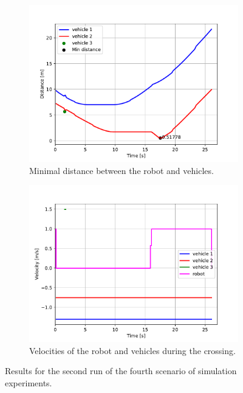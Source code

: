             \begin{figure}[H]
                \centering
                \begin{subfigure}{0.49\linewidth}
                    \centering
                    \includegraphics[trim={13 8 40 41}, clip, width=\linewidth]{images/simulations/scene4_2_dist.pdf}
                    \caption{Minimal distance between the robot and vehicles.}
                \end{subfigure}
                \begin{subfigure}{0.49\linewidth}
                    \centering
                    \includegraphics[trim={13 8 40 41}, clip, width=\linewidth]{images/simulations/scene4_2_vel.pdf}
                    \caption{Velocities of the robot and vehicles during the crossing.}
                \end{subfigure}
                \caption{Results for the second run of the fourth scenario of simulation experiments.}
                \label{fig:scene4_2_graphs}
            \end{figure}
